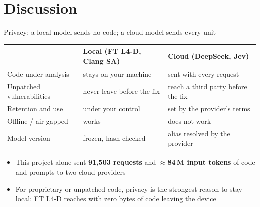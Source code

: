 \section{Discussion}

\begin{frame}{Privacy: a local model sends no code; a cloud model sends every unit}
  \centering\small
  \renewcommand{\arraystretch}{1.15}
  \begin{tabular}{@{}lll@{}}
    \toprule
    & \textbf{Local} (FT L4-D, Clang SA) & \textbf{Cloud} (DeepSeek, Jev) \\
    \midrule
    Code under analysis      & stays on your machine         & sent with every request \\
    Unpatched vulnerabilities & never leave before the fix   & reach a third party before the fix \\
    Retention and use        & under your control            & set by the provider's terms \\
    Offline / air-gapped     & works                         & does not work \\
    Model version            & frozen, hash-checked          & alias resolved by the provider \\
    \bottomrule
  \end{tabular}

  \vspace{0.4em}
  \raggedright
  \begin{itemize}
    \item This project alone sent \textbf{91,503 requests} and \textbf{$\approx$84\,M input tokens} of code and prompts to two cloud providers
    \item \alert{For proprietary or unpatched code, privacy is the strongest reason to stay local: FT L4-D reaches  with zero bytes of code leaving the device}
  \end{itemize}
\end{frame}

